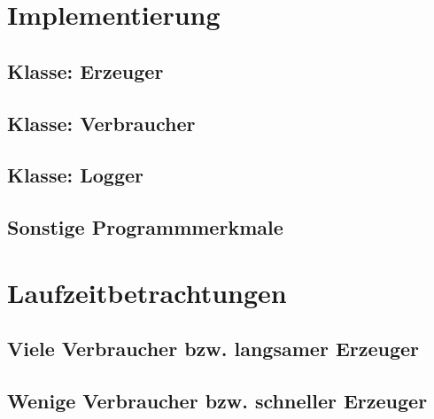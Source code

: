 \section{Implementierung} %
\label{sec:implementierung}

\subsection{Klasse: Erzeuger} %
\label{sub:klasse_erzeuger}


\subsection{Klasse: Verbraucher} %
\label{sub:klasse_verbraucher}


\subsection{Klasse: Logger} %
\label{sub:klasse_logger}


\subsection{Sonstige Programmmerkmale} %
\label{sub:sonstige_programmmerkmale}


\newpage
\section{Laufzeitbetrachtungen} %
\label{sec:laufzeitbetrachtungen}

\subsection{Viele Verbraucher bzw. langsamer Erzeuger} %
\label{sub:viele_verbraucher_bzw_langsamer_erzeuger}


\subsection{Wenige Verbraucher bzw. schneller Erzeuger} %
\label{sub:wenige_verbraucher_bzw_schneller_erzeuger}


